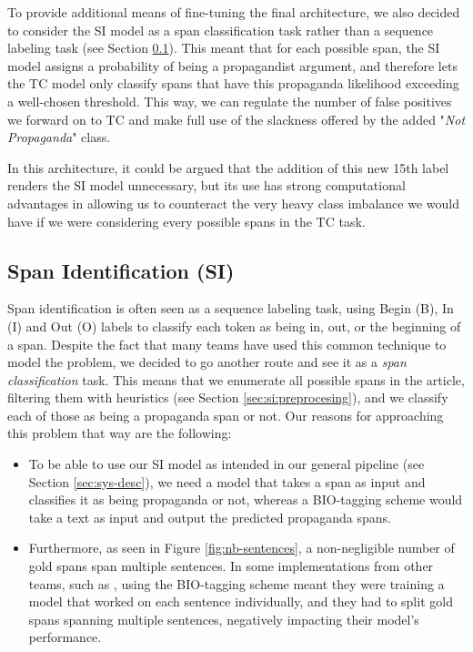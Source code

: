 \documentclass[11pt]{article}
\newcommand{\pol}[1]{{\fontfamily{pcr}\selectfont#1}}
\begin{document}
To provide additional means of fine-tuning the final architecture, we also decided to consider the \pol{SI} model as a span classification task rather than a sequence labeling task (see Section \ref{sec:si}). This meant that for each possible span, the \pol{SI} model assigns a probability of being a propagandist argument, and therefore lets the \pol{TC} model only classify spans that have this propaganda likelihood exceeding a well-chosen threshold. 
This way, we can regulate the number of false positives we forward on to \pol{TC} and make full use of the slackness offered by the added "\textit{Not Propaganda}" class. 

In this architecture, it could be argued that the addition of this new 15th label renders the \pol{SI} model unnecessary, but its use has strong computational advantages in allowing us to counteract the very heavy class imbalance we would have if we were considering every possible spans in the \pol{TC} task.

\subsection{Span Identification (\pol{SI})} \label{sec:si}
Span identification is often seen as a sequence labeling task, using Begin (\pol{B}), In (\pol{I}) and Out (\pol{O}) labels to classify each token as being in, out, or the beginning of a span. Despite the fact that many teams have used this common technique to model the problem, we decided to go another route and see it as a \textit{span classification} task. This means that we enumerate all possible spans in the article, filtering them with heuristics (see Section \ref{sec:si:preprocesing}), and we classify each of those as being a propaganda span or not. Our reasons for approaching this problem that way are the following:
\begin{itemize}
    \item To be able to use our \pol{SI} model as intended in our general pipeline (see Section \ref{sec:sys-desc}), we need a model that takes a span as input and classifies it as being propaganda or not, whereas a \pol{BIO}-tagging scheme would take a text as input and output the predicted propaganda spans.
    \item Furthermore, as seen in Figure \ref{fig:nb-sentences}, a non-negligible number of gold spans span multiple sentences. In some implementations from other teams, such as \cite{dimov2020nopropaganda}, using the \pol{BIO}-tagging scheme meant they were training a model that worked on each sentence individually, and they had to split gold spans spanning multiple sentences, negatively impacting their model's performance.
\end{itemize}
\end{document}
